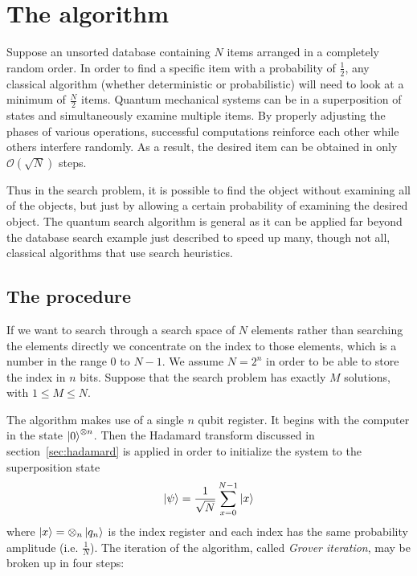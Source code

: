 \section{The algorithm}\label{sec:the-algorithm}
Suppose an unsorted database containing $N$ items arranged in a completely random order. In order to find a specific item with a probability of $\frac{1}{2}$, any classical algorithm (whether deterministic or probabilistic) will need to look at a minimum of $\frac{N}{2}$ items. Quantum mechanical systems can be in a superposition of states and simultaneously examine multiple items. By properly adjusting the phases of various operations, successful computations reinforce each other while others interfere randomly. As a result, the desired item can be obtained in only $\mathcal{O}(\sqrt{N})$ steps.

Thus in the search problem, it is possible to find the object without examining all of the objects, but just by allowing a certain probability of examining the desired object.
The quantum search algorithm is general as it can be applied far beyond the database search example just described to speed up many, though not all, classical algorithms that use search heuristics.

\subsection{The procedure}
If we want to search through a search space of $N$ elements rather than searching the elements directly we concentrate on the index to those elements, which is a number in the range $0$ to $N-1$. We assume $N=2^n$ in order to be able to store the index in $n$ bits. Suppose that the search problem has exactly $M$ solutions, with $1\leq M \leq N$.

The algorithm makes use of a single $n$ qubit register. It begins with the computer in the state $\ket{0}^{\otimes n}$. Then the Hadamard transform discussed in section~\ref{sec:hadamard} is applied in order to initialize the system to the superposition state
\begin{equation}\label{eq:initial-state}
   \ket{\psi} = \frac{1}{\sqrt{N}} \sum_{x=0}^{N-1}\ket{x}
\end{equation}
where $\ket{x} = \otimes_n \ket{q_n}$ is the index register and each index has the same probability amplitude (i.e. $\frac{1}{N}$).
The iteration of the algorithm, called \emph{Grover iteration}, may be broken up in four steps:

